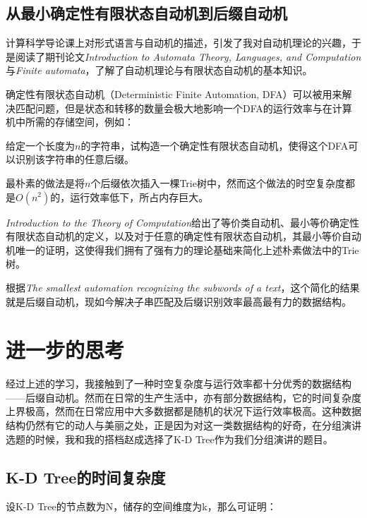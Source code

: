 \documentclass{article}
\begin{document}
\subsection{从最小确定性有限状态自动机到后缀自动机}
计算科学导论课上对形式语言与自动机的描述，引发了我对自动机理论的兴趣，于是阅读了期刊论文\emph{Introduction to Automata Theory, Languages, and Computation}\cite{ref1}与\emph{Finite automata}\cite{ref2}，了解了自动机理论与有限状态自动机的基本知识。\par
确定性有限状态自动机（Deterministic Finite Automation, DFA）可以被用来解决匹配问题，但是状态和转移的数量会极大地影响一个DFA的运行效率与在计算机中所需的存储空间，例如：\par
给定一个长度为$n$的字符串，试构造一个确定性有限状态自动机，使得这个DFA可以识别该字符串的任意后缀。\par
最朴素的做法是将$n$个后缀依次插入一棵Trie树中，然而这个做法的时空复杂度都是$O(n^2)$的，运行效率低下，所占内存巨大。\par
\emph{Introduction to the Theory of Computation}\cite{ref3}给出了等价类自动机、最小等价确定性有限状态自动机的定义，以及对于任意的确定性有限状态自动机，其最小等价自动机唯一的证明，这使得我们拥有了强有力的理论基础来简化上述朴素做法中的Trie树。\par
根据\emph{The smallest automation recognizing the subwords of a text}\cite{ref4}，这个简化的结果就是后缀自动机，现如今解决子串匹配及后缀识别效率最高最有力的数据结构。\par

\section{进一步的思考}
经过上述的学习，我接触到了一种时空复杂度与运行效率都十分优秀的数据结构——后缀自动机。然而在日常的生产生活中，亦有部分数据结构，它的时间复杂度上界极高，然而在日常应用中大多数据都是随机的状况下运行效率极高。这种数据结构仍然有它的动人与美丽之处，正是因为对这一类数据结构的好奇，在分组演讲选题的时候，我和我的搭档赵成选择了K-D Tree作为我们分组演讲的题目。

\subsection{K-D Tree的时间复杂度}
设K-D Tree的节点数为N，储存的空间维度为k，那么可证明：\par
\end{document}
